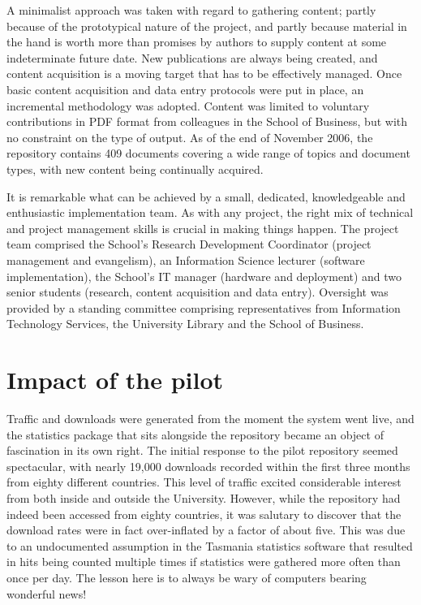 \documentclass[12pt,pdftex,a4paper,titlepage]{article}
\begin{document}
A minimalist approach was taken with regard to gathering content; partly because of the prototypical nature of the project, and partly because material in the hand is worth more than promises by authors to supply content at some indeterminate future date. New publications are always being created, and content acquisition is a moving target that has to be effectively managed. Once basic content acquisition and data entry protocols were put in place, an incremental methodology was adopted. Content was limited to voluntary contributions in PDF format from colleagues in the School of Business, but with no constraint on the type of output. As of the end of November 2006, the repository contains 409 documents covering a wide range of topics and document types, with new content being continually acquired.

It is remarkable what can be achieved by a small, dedicated, knowledgeable and enthusiastic implementation team. As with any project, the right mix of technical and project management skills is crucial in making things happen. The project team comprised the School's Research Development Coordinator (project management and evangelism), an Information Science lecturer (software implementation), the School's IT manager (hardware and deployment) and two senior students (research, content acquisition and data entry). Oversight was provided by a standing committee comprising representatives from Information Technology Services, the University Library and the School of Business.


\section{Impact of the pilot}

Traffic and downloads were generated from the moment the system went live, and the statistics package that sits alongside the repository became an object of fascination in its own right. The initial response to the pilot repository seemed spectacular, with nearly 19,000 downloads recorded within the first three months from eighty different countries. This level of traffic excited considerable interest from both inside and outside the University. However, while the repository had indeed been accessed from eighty countries, it was salutary to discover that the download rates were in fact over-inflated by a factor of about five. This was due to an undocumented assumption in the Tasmania statistics software \cite{Sale-A-2006-stats} that resulted in hits being counted multiple times if statistics were gathered more often than once per day. The lesson here is to always be wary of computers bearing wonderful news!
\end{document}
